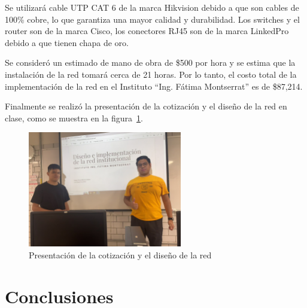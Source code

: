     Se utilizará cable UTP CAT 6\cite{cable} de la marca Hikvision debido a que son cables de 100\% cobre, lo que garantiza una mayor calidad y durabilidad. Los switches\cite{switch} y el router\cite{Router} son de la marca Cisco, los conectores RJ45\cite{conectores} son de la marca LinkedPro debido a que tienen chapa de oro.

    Se consideró un estimado de mano de obra de \$500 por hora y se estima que la instalación de la red tomará cerca de 21 horas. Por lo tanto, el costo total de la implementación de la red en el Instituto “Ing. Fátima Montserrat” es de \$87,214.

    Finalmente se realizó la presentación de la cotización y el diseño de la red en clase, como se muestra en la figura~\ref{fig:presentacion}.

    \begin{figure}[H]
        \centering
        \includegraphics[width=0.6\textwidth]{img/presentacion.jpeg}
        \caption{Presentación de la cotización y el diseño de la red}
        \label{fig:presentacion}
    \end{figure}

\section{Conclusiones}

